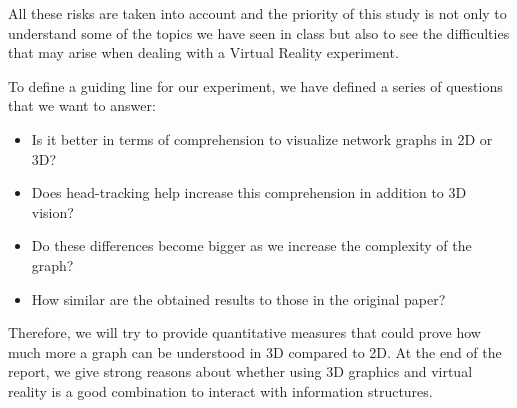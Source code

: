 All these risks are taken into account and the priority of this study is
not only to understand some of the topics we have seen in class but also to
see the difficulties that may arise when dealing with a Virtual Reality
experiment.

To define a guiding line for our experiment, we have defined a series of
questions that we want to answer:

\begin{itemize}
\item
  Is it better in terms of comprehension to visualize network graphs in
  2D or 3D?
\item
  Does head-tracking help increase this comprehension in addition to 3D
  vision?
\item
  Do these differences become bigger as we increase the complexity of
  the graph?
\item
  How similar are the obtained results to those in the original paper?
\end{itemize}

Therefore, we will try to provide quantitative measures that could prove
how much more a graph can be understood in 3D compared to 2D. At the
end of the report, we give strong reasons about whether using 3D
graphics and virtual reality is a good combination to interact with
information structures.
